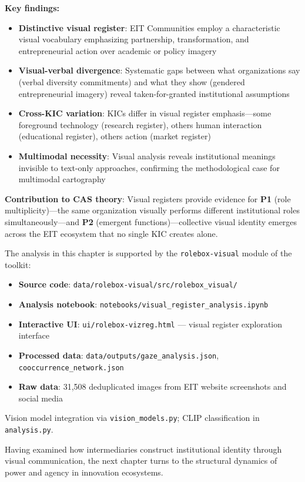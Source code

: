 \documentclass[../main.tex]{subfiles}
\begin{document}
\begin{summarybox}
\textbf{Key findings:}
\begin{itemize}[leftmargin=*, itemsep=0.1em]
\item \textbf{Distinctive visual register}: EIT Communities employ a characteristic visual vocabulary emphasizing partnership, transformation, and entrepreneurial action over academic or policy imagery
\item \textbf{Visual-verbal divergence}: Systematic gaps between what organizations say (verbal diversity commitments) and what they show (gendered entrepreneurial imagery) reveal taken-for-granted institutional assumptions
\item \textbf{Cross-KIC variation}: KICs differ in visual register emphasis---some foreground technology (research register), others human interaction (educational register), others action (market register)
\item \textbf{Multimodal necessity}: Visual analysis reveals institutional meanings invisible to text-only approaches, confirming the methodological case for multimodal cartography
\end{itemize}

\textbf{Contribution to CAS theory}: Visual registers provide evidence for \textbf{P1} (role multiplicity)---the same organization visually performs different institutional roles simultaneously---and \textbf{P2} (emergent functions)---collective visual identity emerges across the EIT ecosystem that no single KIC creates alone.
\end{summarybox}

\vspace{0.5em}
\begin{replicationbox}
The analysis in this chapter is supported by the \texttt{rolebox-visual} module of the \RoleBox{} toolkit:
\begin{itemize}[leftmargin=*, itemsep=0.2em]
\item \textbf{Source code}: \texttt{data/rolebox-visual/src/rolebox\_visual/}
\item \textbf{Analysis notebook}: \texttt{notebooks/visual\_register\_analysis.ipynb}
\item \textbf{Interactive UI}: \texttt{ui/rolebox-vizreg.html} --- visual register exploration interface
\item \textbf{Processed data}: \texttt{data/outputs/gaze\_analysis.json}, \texttt{cooccurrence\_network.json}
\item \textbf{Raw data}: 31,508 deduplicated images from EIT website screenshots and social media
\end{itemize}
Vision model integration via \texttt{vision\_models.py}; CLIP classification in \texttt{analysis.py}.
\end{replicationbox}

\vspace{1em}
Having examined how intermediaries construct institutional identity through visual communication, the next chapter turns to the structural dynamics of power and agency in innovation ecosystems.
\end{document}
